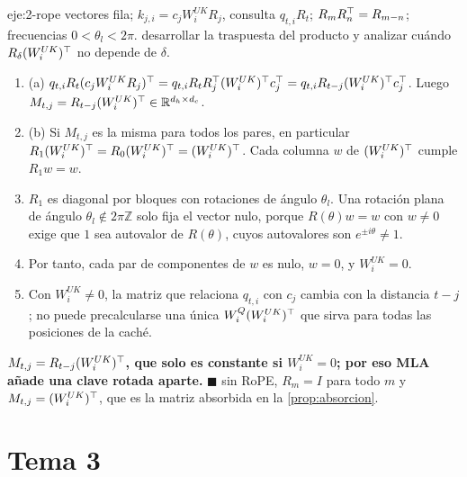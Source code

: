 \begin{solucion}{eje:2-rope}
\datos vectores fila; $k_{j,i}=c_jW^{UK}_iR_j$, consulta $q_{t,i}R_t$; $R_mR_n^{\top}=R_{m-n}$; frecuencias $0<\theta_l<2\pi$.
\planteamiento desarrollar la traspuesta del producto y analizar cuándo $R_\delta(W^{UK}_i)^{\top}$ no depende de $\delta$.
\pasos
\begin{enumerate}[label=\arabic*.]
  \item (a) $q_{t,i}R_t(c_jW^{UK}_iR_j)^{\top}=q_{t,i}R_tR_j^{\top}(W^{UK}_i)^{\top} c_j^{\top}=q_{t,i}R_{t-j}(W^{UK}_i)^{\top} c_j^{\top}$. Luego $M_{t,j}=R_{t-j}(W^{UK}_i)^{\top}\in\mathbb{R}^{d_{h}\times d_{c}}$.
  \item (b) Si $M_{t,j}$ es la misma para todos los pares, en particular $R_{1}(W^{UK}_i)^{\top}=R_0(W^{UK}_i)^{\top}=(W^{UK}_i)^{\top}$. Cada columna $w$ de $(W^{UK}_i)^{\top}$ cumple $R_1w=w$.
  \item $R_1$ es diagonal por bloques con rotaciones de ángulo $\theta_l$. Una rotación plana de ángulo $\theta_l\notin 2\pi\mathbb Z$ solo fija el vector nulo, porque $R(\theta)w=w$ con $w\ne 0$ exige que $1$ sea autovalor de $R(\theta)$, cuyos autovalores son $e^{\pm i\theta}\ne 1$.
  \item Por tanto, cada par de componentes de $w$ es nulo, $w=0$, y $W^{UK}_i=0$.
  \item Con $W^{UK}_i\ne 0$, la matriz que relaciona $q_{t,i}$ con $c_j$ cambia con la distancia $t-j$; no puede precalcularse una única $W^{Q}_i(W^{UK}_i)^{\top}$ que sirva para todas las posiciones de la caché.
\end{enumerate}
\resultado \textbf{$M_{t,j}=R_{t-j}(W^{UK}_i)^{\top}$, que solo es constante si $W^{UK}_i=0$; por eso MLA añade una clave rotada aparte.} $\blacksquare$
\comprobacion sin RoPE, $R_m=I$ para todo $m$ y $M_{t,j}=(W^{UK}_i)^{\top}$, que es la matriz absorbida en la \cref{prop:absorcion}.
\end{solucion}

\section{Tema 3}


